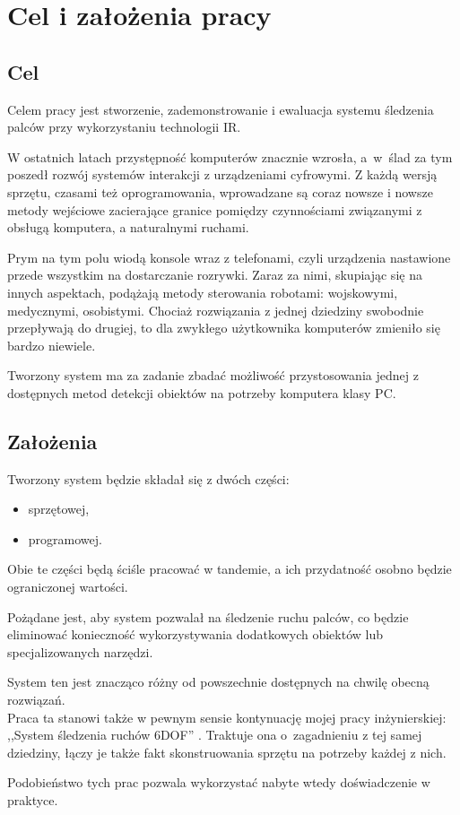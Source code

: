 \chapter{Cel i założenia pracy}\label{ch:purpose}

\section{Cel}

Celem pracy jest stworzenie, zademonstrowanie i ewaluacja systemu śledzenia palców przy wykorzystaniu technologii IR.

W ostatnich latach przystępność komputerów znacznie wzrosła, a~w~ślad za tym poszedł rozwój systemów interakcji z urządzeniami cyfrowymi. Z każdą wersją sprzętu, czasami też oprogramowania, wprowadzane są coraz nowsze i nowsze metody wejściowe zacierające granice pomiędzy czynnościami związanymi z obsługą komputera, a naturalnymi ruchami.

Prym na tym polu wiodą konsole wraz z telefonami, czyli urządzenia nastawione przede wszystkim na dostarczanie rozrywki. Zaraz za nimi, skupiając się na innych aspektach, podążają metody sterowania robotami: wojskowymi, medycznymi, osobistymi. Chociaż rozwiązania z jednej dziedziny swobodnie przepływają do drugiej, to dla zwykłego użytkownika komputerów zmieniło się bardzo niewiele.

Tworzony system ma za zadanie zbadać możliwość przystosowania jednej z dostępnych metod detekcji obiektów na potrzeby komputera klasy PC.\\

\section{Założenia}

Tworzony system będzie składał się z dwóch części:
\begin{itemize}
 \item sprzętowej,
 \item programowej.
\end{itemize}

Obie te części będą ściśle pracować w tandemie, a ich przydatność osobno będzie ograniczonej wartości.

Pożądane jest, aby system pozwalał na śledzenie ruchu palców, co będzie eliminować konieczność wykorzystywania dodatkowych obiektów lub specjalizowanych narzędzi.

System ten jest znacząco różny od powszechnie dostępnych na chwilę obecną rozwiązań.\\

Praca ta stanowi także w pewnym sensie kontynuację mojej pracy inżynierskiej: ,,System śledzenia ruchów 6DOF'' \cite{inz}.
Traktuje ona o~zagadnieniu z tej samej dziedziny, łączy je także fakt skonstruowania sprzętu na potrzeby każdej z nich.

Podobieństwo tych prac pozwala wykorzystać nabyte wtedy doświadczenie w praktyce.
